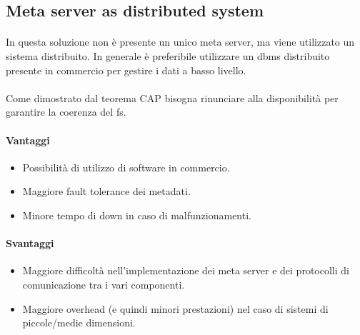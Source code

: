 \documentclass[11pt,a4paper,english]{article}
\begin{document}
\subsection{Meta server as distributed system}

\paragraph{} In questa soluzione non è presente un unico meta server, ma viene utilizzato un sistema distribuito. In generale è preferibile utilizzare un dbms distribuito presente in commercio per gestire i dati a basso livello. 

\paragraph{} Come dimostrato dal teorema CAP bisogna rinunciare alla disponibilità per garantire la coerenza del fs. 

\paragraph{Vantaggi} \begin{itemize}
	\item Possibilità di utilizzo di software in commercio.
	\item Maggiore fault tolerance dei metadati.
	\item Minore tempo di down in caso di malfunzionamenti.
\end{itemize}

\paragraph{Svantaggi} \begin{itemize}
	\item Maggiore difficoltà nell'implementazione dei meta server e dei protocolli di comunicazione tra i vari componenti. 
	\item Maggiore overhead (e quindi minori prestazioni) nel caso di sistemi di piccole/medie dimensioni.
\end{itemize}
\end{document}
